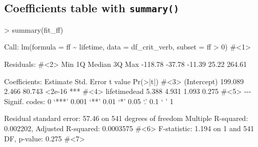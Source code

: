 \documentclass[
  letterpaper,
  DIV=11,
  numbers=noendperiod]{scrartcl}
\newenvironment{Shaded}{\begin{snugshade}}{\end{snugshade}}
\newcommand{\AttributeTok}[1]{\textcolor[rgb]{0.40,0.45,0.13}{#1}}
\newcommand{\CommentTok}[1]{\textcolor[rgb]{0.37,0.37,0.37}{#1}}
\newcommand{\DecValTok}[1]{\textcolor[rgb]{0.68,0.00,0.00}{#1}}
\newcommand{\ErrorTok}[1]{\textcolor[rgb]{0.68,0.00,0.00}{#1}}
\newcommand{\FloatTok}[1]{\textcolor[rgb]{0.68,0.00,0.00}{#1}}
\newcommand{\FunctionTok}[1]{\textcolor[rgb]{0.28,0.35,0.67}{#1}}
\newcommand{\NormalTok}[1]{\textcolor[rgb]{0.00,0.23,0.31}{#1}}
\newcommand{\SpecialCharTok}[1]{\textcolor[rgb]{0.37,0.37,0.37}{#1}}
\begin{document}
\hypertarget{coefficients-table-with-summary}{%
\subsection{\texorpdfstring{Coefficients table with
\texttt{summary()}}{Coefficients table with summary()}}\label{coefficients-table-with-summary}}

\hypertarget{annotated-cell-1}{%
\label{annotated-cell-1}}%
\begin{Shaded}
\begin{Highlighting}[]
\SpecialCharTok{\textgreater{}} \FunctionTok{summary}\NormalTok{(fit\_ff)}

\NormalTok{Call}\SpecialCharTok{:}
\FunctionTok{lm}\NormalTok{(}\AttributeTok{formula =}\NormalTok{ ff }\SpecialCharTok{\textasciitilde{}}\NormalTok{ lifetime, }\AttributeTok{data =}\NormalTok{ df\_crit\_verb, }\AttributeTok{subset =}\NormalTok{ ff }\SpecialCharTok{\textgreater{}} \DecValTok{0}\NormalTok{) }\CommentTok{\#\textless{}1\textgreater{}}

\NormalTok{Residuals}\SpecialCharTok{:}                                                        \CommentTok{\#\textless{}2\textgreater{}}
\NormalTok{    Min      1Q  Median      3Q     Max }
\SpecialCharTok{{-}}\FloatTok{118.78}  \SpecialCharTok{{-}}\FloatTok{37.78}  \SpecialCharTok{{-}}\FloatTok{11.39}   \FloatTok{25.22}  \FloatTok{264.61} 

\NormalTok{Coefficients}\SpecialCharTok{:}
\NormalTok{             Estimate Std. Error t value }\FunctionTok{Pr}\NormalTok{(}\SpecialCharTok{\textgreater{}}\ErrorTok{|}\NormalTok{t}\SpecialCharTok{|}\NormalTok{)                }\CommentTok{\#\textless{}3\textgreater{}}
\NormalTok{(Intercept)   }\FloatTok{199.089}      \FloatTok{2.466}  \FloatTok{80.743}   \SpecialCharTok{\textless{}}\FloatTok{2e{-}16} \SpecialCharTok{**}\ErrorTok{*}            \CommentTok{\#\textless{}4\textgreater{}}
\NormalTok{lifetimedead    }\FloatTok{5.388}      \FloatTok{4.931}   \FloatTok{1.093}    \FloatTok{0.275}                \CommentTok{\#\textless{}5\textgreater{}}
\SpecialCharTok{{-}{-}{-}}
\NormalTok{Signif. codes}\SpecialCharTok{:}  \DecValTok{0}\NormalTok{ ‘}\SpecialCharTok{**}\ErrorTok{*}\NormalTok{’ }\FloatTok{0.001}\NormalTok{ ‘}\SpecialCharTok{**}\NormalTok{’ }\FloatTok{0.01}\NormalTok{ ‘}\SpecialCharTok{*}\NormalTok{’ }\FloatTok{0.05}\NormalTok{ ‘.’ }\FloatTok{0.1}\NormalTok{ ‘ ’ }\DecValTok{1}

\NormalTok{Residual standard error}\SpecialCharTok{:} \FloatTok{57.46}\NormalTok{ on }\DecValTok{541}\NormalTok{ degrees of freedom}
\NormalTok{Multiple R}\SpecialCharTok{{-}}\NormalTok{squared}\SpecialCharTok{:}  \FloatTok{0.002202}\NormalTok{,  Adjusted R}\SpecialCharTok{{-}}\NormalTok{squared}\SpecialCharTok{:}  \FloatTok{0.0003575}   \CommentTok{\#\textless{}6\textgreater{}}
\NormalTok{F}\SpecialCharTok{{-}}\NormalTok{statistic}\SpecialCharTok{:} \FloatTok{1.194}\NormalTok{ on }\DecValTok{1}\NormalTok{ and }\DecValTok{541}\NormalTok{ DF,  p}\SpecialCharTok{{-}}\NormalTok{value}\SpecialCharTok{:} \FloatTok{0.275}              \CommentTok{\#\textless{}7\textgreater{}}
\end{Highlighting}
\end{Shaded}
\end{document}
